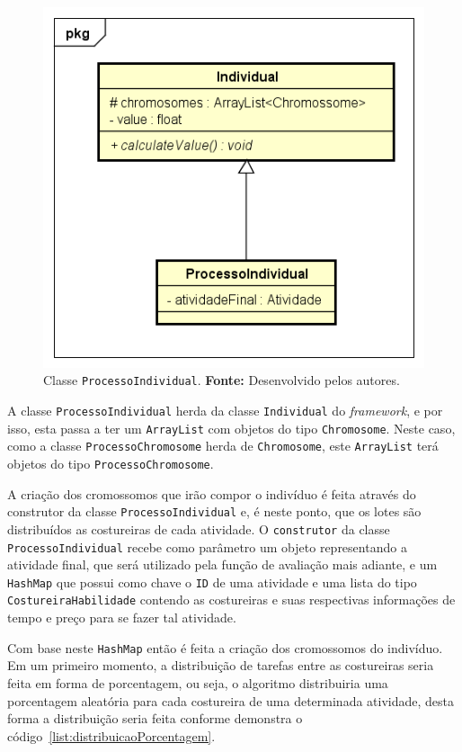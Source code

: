 \begin{figure}[h!]
	\centerline{\includegraphics[scale=0.7]{./imagens/class_individual.png}}
	\caption[Classe \texttt{ProcessoIndividual}.]
	{Classe \texttt{ProcessoIndividual}. \textbf{Fonte:} Desenvolvido pelos
	autores.}
	\label{fig:class_processoIndividual}
\end{figure}

\par A classe \texttt{ProcessoIndividual} herda da classe \texttt{Individual} do
\textit{framework}, e por isso, esta passa a ter um \texttt{ArrayList} com
objetos do tipo \texttt{Chromosome}. Neste caso, como a classe \texttt{ProcessoChromosome} herda de \texttt{Chromosome}, 
este \texttt{ArrayList} terá objetos do tipo \texttt{ProcessoChromosome}.

\par A criação dos cromossomos que irão compor o indivíduo é feita através do construtor da classe 
\texttt{ProcessoIndividual} e, é neste ponto, que os lotes são distribuídos as costureiras de cada atividade.
O \texttt{construtor} da classe \texttt{ProcessoIndividual} recebe como
parâmetro um objeto representando a atividade final, que será utilizado pela função de avaliação mais adiante, e um \texttt{HashMap} que possui como chave o
\texttt{ID} de uma atividade e uma lista do  tipo \texttt{CostureiraHabilidade} contendo as costureiras e suas respectivas informações de tempo e preço para se fazer tal atividade.

\par Com base neste \texttt{HashMap} então é feita a criação dos cromossomos do indivíduo.
Em um primeiro momento, a distribuição de tarefas entre as costureiras seria feita em forma 
de porcentagem, ou seja, o algoritmo distribuiria uma porcentagem aleatória para cada costureira de 
uma determinada atividade, desta forma a distribuição seria feita conforme demonstra o código~\ref{list:distribuicaoPorcentagem}.

